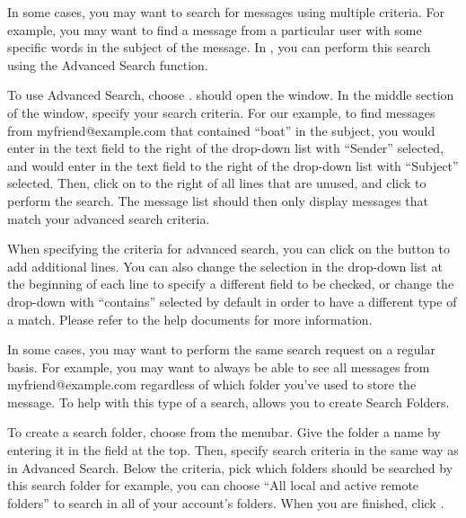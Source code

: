 In some cases, you may want to search for messages using multiple criteria.
For example, you may want to find a message from a particular user with some
specific words in the subject of the message. In , you can perform
this search using the Advanced Search function.



To use Advanced Search, choose . 
should open the  window. In the middle section of
the window, specify your search criteria. For our example, to find messages
from myfriend@example.com that contained ``boat'' in the subject, you would
enter  in the text field to the right of 
the drop-down list with ``Sender'' selected, and would enter 
in the text field to the right of the drop-down list with ``Subject'' selected.
Then, click on  to the right of all lines that are unused, and
click  to perform the search. The message list should then only 
display messages that match your advanced search criteria. 

When specifying the criteria for advanced search, you can click on the 
 button to add additional lines. You can also change the
selection in the drop-down list at the beginning of each line to specify 
a different field to be checked, or change the drop-down with ``contains''
selected by default in order to have a different type of a match. Please
refer to the  help documents for more information.

In some cases, you may want to perform the same search request on a 
regular basis. For example, you may want to always be able to see all messages
from myfriend@example.com regardless of which folder you've used to store the
message. To help with this type of a search,  allows you to create
Search Folders.

To create a search folder, choose  from the menubar. Give the folder a name by entering it in the
 field at the top. Then, specify search criteria in the 
same way as in Advanced Search. Below the criteria, pick which folders should be
searched by this search folder \dash for example, you can choose ``All local
and active remote folders'' to search in all of your account's folders. When
you are finished, click .

